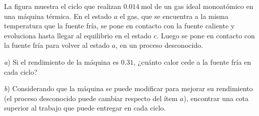 \documentclass[a4paper,11pt,dvipsnames]{article}
\begin{document}
\begin{enumerate}[leftmargin=*]
\begin{minipage}[t]{.55\textwidth}
\item
  La figura muestra el ciclo que realizan $\SI{0.014}{\mol}$ de un gas ideal monoatómico en una máquina térmica. En el estado $a$ el gas, que se encuentra a la misma temperatura que la fuente fría, se pone en contacto con la fuente caliente y evoluciona hasta llegar al equilibrio en el estado $c$. Luego se pone en contacto con la fuente fría para volver al estado $a$, en un proceso desconocido.\par
  \textit{a}) Si el rendimiento de la máquina es $0.31$, ¿cuánto calor cede a la fuente fría en cada ciclo?\par
  \textit{b}) Considerando que la máquina se puede modificar para mejorar su rendimiento (el proceso desconocido puede cambiar respecto del ítem $a$), encontrar una cota superior al trabajo que puede entregar en cada ciclo.
\end{minipage}
\begin{minipage}[t]{.45\textwidth}
	\strut\vspace*{-\baselineskip}
  \begin{center}
  \end{center}
\end{minipage}


\end{enumerate}
\end{document}

